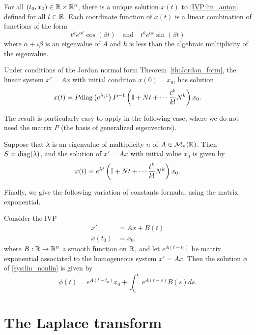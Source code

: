 \begin{theorem}
For all $(t_0,x_0)\in\mathbb{R}\times\mathbb{R}^n$, there is a unique solution $x(t)$ to \eqref{IVP:lin_auton} defined for all $t\in\mathbb{R}$. Each coordinate function of $x(t)$ is a linear combination of functions of the form
\[
t^ke^{\alpha t}\cos(\beta t)\quad\textrm{and}\quad t^ke^{\alpha t}\sin(\beta t)
\]
where $\alpha+i\beta$ is an eigenvalue of $A$ and $k$ is less than the algebraic multiplicity of the eigenvalue.
\end{theorem}
\begin{theorem}
Under conditions of the Jordan normal form Theorem~\ref{th:Jordan_form}, the linear system $x'=Ax$ with initial condition $x(0)=x_0$, has solution
\[
x(t)=P\textrm{diag}\left(e^{\lambda_j t}\right)P^{-1}\left(\mathbb{I}+Nt+\cdots\frac{t^k}{k!}N^k\right) x_0.
\]
\end{theorem}
The result is particularly easy to apply in the following case, where we do not need the matrix $P$ (the basis of generalized eigenvectors).
\begin{theorem}
\label{th:Jordan_simple_case}
Suppose that $\lambda$ is an eigenvalue of multiplicity $n$ of $A\in\mathcal{M}_n(\mathbb{R})$. Then $S=\textrm{diag}(\lambda)$, and the solution of $x'=Ax$ with initial value $x_0$ is given by
\[
x(t)=e^{\lambda t}\left(\mathbb{I}+Nt+\cdots\frac{t^k}{k!}N^k\right) x_0.
\]
\end{theorem}


Finally, we give the following variation of constants formula, using the matrix exponential.
\begin{theorem}
Consider the IVP
\begin{subequations}\label{sys:lin_nonlin}
\begin{align}
x' &= Ax+B(t) \\
x(t_0) &= x_0,
\end{align}
\end{subequations}
where $B:\mathbb{R}\to\mathbb{R}^n$ a smooth function on $\mathbb{R}$, and let $e^{A(t-t_0)}$ be matrix exponential associated to the homogeneous system $x'=Ax$. Then the solution $\phi$ of \eqref{sys:lin_nonlin} is given by
\begin{equation}
\phi(t)=e^{A(t-t_0)}x_0 + \int_{t_0}^t e^{A(t-s)}B(s)ds.
\end{equation}
\end{theorem}







\section{The Laplace transform}


